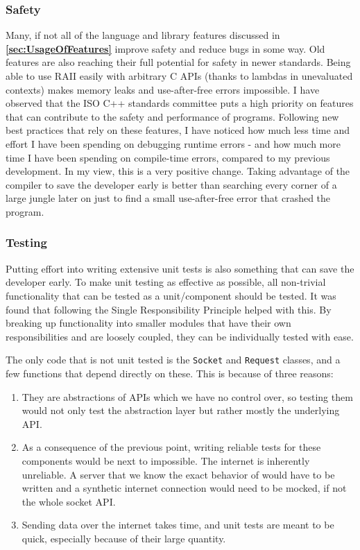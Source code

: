 \documentclass[12pt, a4paper]{article}
\begin{document}
\subsubsection{Safety}
Many, if not all of the language and library features discussed in \textbf{\ref{sec:UsageOfFeatures}} improve safety and reduce bugs in some way. Old features are also reaching their full potential for safety in newer standards. Being able to use RAII easily with arbitrary C APIs (thanks to lambdas in unevaluated contexts) makes memory leaks and use-after-free errors impossible. I have observed that the ISO C++ standards committee puts a high priority on features that can contribute to the safety and performance of programs. Following new best practices that rely on these features, I have noticed how much less time and effort I have been spending on debugging runtime errors - and how much more time I have been spending on compile-time errors, compared to my previous development. In my view, this is a very positive change. Taking advantage of the compiler to save the developer early is better than searching every corner of a large jungle later on just to find a small use-after-free error that crashed the program. 

\subsubsection{Testing}
Putting effort into writing extensive unit tests is also something that can save the developer early. To make unit testing as effective as possible, all non-trivial functionality that can be tested as a unit/component should be tested. It was found that following the Single Responsibility Principle helped with this. By breaking up functionality into smaller modules that have their own responsibilities and are loosely coupled, they can be individually tested with ease. 

The only code that is not unit tested is the \texttt{Socket} and \texttt{Request} classes, and a few functions that depend directly on these. This is because of three reasons:

\begin{enumerate}
	\item They are abstractions of APIs which we have no control over, so testing them would not only test the abstraction layer but rather mostly the underlying API.
	\item As a consequence of the previous point, writing reliable tests for these components would be next to impossible. The internet is inherently unreliable. A server that we know the exact behavior of would have to be written and a synthetic internet connection would need to be mocked, if not the whole socket API.
	\item Sending data over the internet takes time, and unit tests are meant to be quick, especially because of their large quantity.
\end{enumerate}
\end{document}
